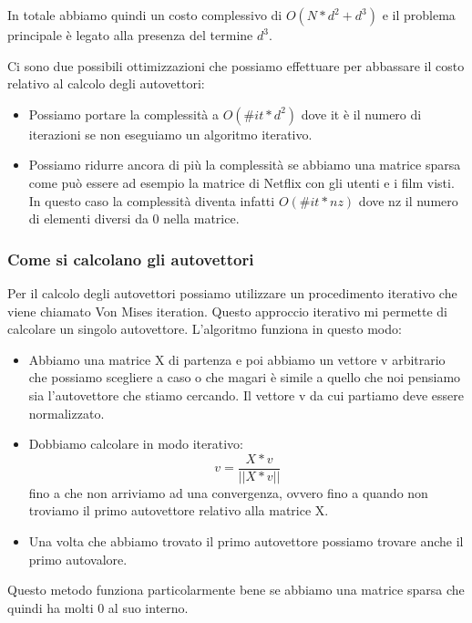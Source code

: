 \documentclass[14pt]{extreport}
\begin{document}
In totale abbiamo quindi un costo complessivo di $O(N*d^2+d^3)$ e il problema principale è legato alla presenza del termine $d^3$.

Ci sono due possibili ottimizzazioni che possiamo effettuare per abbassare il costo relativo al calcolo degli autovettori:
\begin{itemize}
	\item Possiamo portare la complessità a $O(\#it * d^{2})$ dove it è il numero di iterazioni se non eseguiamo un algoritmo iterativo.
	\item Possiamo ridurre ancora di più la complessità se abbiamo una matrice sparsa come può essere ad esempio la matrice di Netflix con gli utenti
	      e i film visti. In questo caso la complessità diventa infatti $O(\#it*nz)$ dove nz il numero di elementi diversi da 0 nella matrice.
\end{itemize}

\subsubsection{Come si calcolano gli autovettori}

Per il calcolo degli autovettori possiamo utilizzare un procedimento iterativo che viene chiamato Von Mises iteration. Questo approccio iterativo mi
permette di calcolare un singolo autovettore. L'algoritmo funziona in questo modo:

\begin{itemize}
	\item Abbiamo una matrice X di partenza e poi abbiamo un vettore v arbitrario che possiamo scegliere a caso o che magari è simile a quello che noi
	      pensiamo sia l'autovettore che stiamo cercando. Il vettore v da cui partiamo deve essere normalizzato.
	\item Dobbiamo calcolare in modo iterativo: $$v = \frac{X*v}{||X*v||}$$ fino a che non arriviamo ad una convergenza, ovvero fino a quando non
	troviamo il primo autovettore relativo alla matrice X.
	\item Una volta che abbiamo trovato il primo autovettore possiamo trovare anche il primo autovalore.
\end{itemize}

Questo metodo funziona particolarmente bene se abbiamo una matrice sparsa che quindi ha molti 0 al suo interno.
\end{document}
